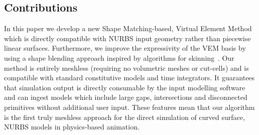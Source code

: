 \subsection{Contributions} 
In this paper we develop a new Shape Matching-based, Virtual Element Method which is directly compatible 
with NURBS input geometry rather than piecewise linear surfaces. 
Furthermore, we improve the expressivity of the VEM basis by using a shape blending approach inspired by
algorithms for skinning~\cite{skinningcourse:2014}.
Our method is entirely meshless (requiring no volumetric meshes or cut-cells) and is compatible with standard constitutive models and time integrators.
It guarantees that simulation output is directly consumable by the input modelling software and can ingest models which include large gaps,
intersections and disconnected primitives without additional user input. 
These features mean that our algorithm is the first truly meshless approach for the direct simulation of curved surface, NURBS models in physics-based animation.

